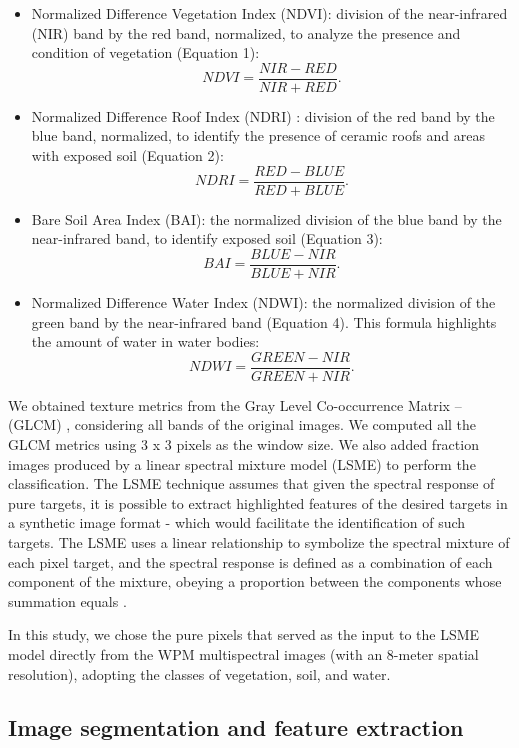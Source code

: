 \documentclass[preprint, 3p,
authoryear]{elsarticle} %
\providecommand{\tightlist}{%
  \setlength{\itemsep}{0pt}\setlength{\parskip}{0pt}}
\begin{document}
\begin{itemize}
\tightlist
\item
  Normalized Difference Vegetation Index (NDVI): division of the
  near-infrared (NIR) band by the red band, normalized, to analyze the
  presence and condition of vegetation (Equation 1): \[ 
  NDVI = \frac{NIR - RED}{NIR + RED}.
  \]
\item
  Normalized Difference Roof Index (NDRI) \citep{Pinho2011}: division of
  the red band by the blue band, normalized, to identify the presence of
  ceramic roofs and areas with exposed soil (Equation 2): \[ 
  NDRI = \frac{RED - BLUE}{RED + BLUE}.
  \]
\item
  Bare Soil Area Index (BAI): the normalized division of the blue band
  by the near-infrared band, to identify exposed soil (Equation 3): \[ 
  BAI = \frac{BLUE - NIR}{BLUE + NIR}.
  \]
\item
  Normalized Difference Water Index (NDWI): the normalized division of
  the green band by the near-infrared band (Equation 4). This formula
  highlights the amount of water in water bodies: \[ 
  NDWI = \frac{GREEN - NIR}{GREEN + NIR}.
  \]
\end{itemize}

We obtained texture metrics from the Gray Level Co-occurrence Matrix --
(GLCM) \citep{Haralick1973}, considering all bands of the original
images. We computed all the GLCM metrics using 3 x 3 pixels as the
window size. We also added fraction images produced by a linear spectral
mixture model (LSME) to perform the classification. The LSME technique
assumes that given the spectral response of pure targets, it is possible
to extract highlighted features of the desired targets in a synthetic
image format - which would facilitate the identification of such
targets. The LSME uses a linear relationship to symbolize the spectral
mixture of each pixel target, and the spectral response is defined as a
combination of each component of the mixture, obeying a proportion
between the components whose summation equals \citep{Shimabukuro2019}.

In this study, we chose the pure pixels that served as the input to the
LSME model directly from the WPM multispectral images (with an 8-meter
spatial resolution), adopting the classes of vegetation, soil, and
water.

\hypertarget{image-segmentation-and-feature-extraction}{%
\subsection{Image segmentation and feature
extraction}\label{image-segmentation-and-feature-extraction}}
\end{document}
